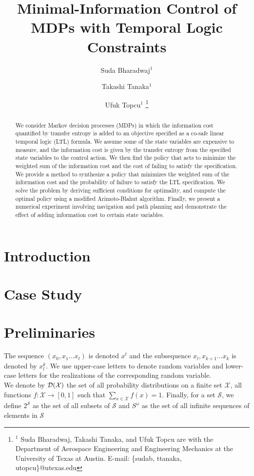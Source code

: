 \documentclass[letterpaper, 10 pt, conference]{ieeeconf}  %
\title{Minimal-Information Control of MDPs with Temporal Logic Constraints
}
\author{Suda Bharadwaj$^{1}$ \and Takashi Tanaka$^{1}$ \and Ufuk Topcu$^{1}$%
\thanks{$^{1}$ Suda Bharadwaj, Takashi Tanaka, and Ufuk Topcu are with the Department of Aerospace Engineering and Engineering Mechanics at the University of Texas at Austin. E-mail: \{sudab, ttanaka, utopcu\}@utexas.edu}%
}
\begin{document}
\maketitle
\thispagestyle{empty}
\pagestyle{empty}


\begin{abstract}
We consider Markov decision processes (MDPs) in which the information cost quantified by transfer entropy is added to an objective specified as a co-safe linear temporal logic (LTL) formula. We assume some of the state variables are expensive to measure, and the information cost is given by the transfer entropy from the specified state variables to the control action. We then find the policy that acts to minimize the weighted sum of the information cost and the cost of failing to satisfy the specification. We provide a method to synthesize a policy that minimizes the weighted sum of the information cost and the probability of failure to satisfy the LTL specification. We solve the problem by deriving sufficient conditions for optimality, and compute the optimal policy using a modified Arimoto-Blahut algorithm. Finally, we present a numerical experiment involving navigation and path planning and demonstrate the effect of adding information cost to certain state variables.
\end{abstract}


\section{Introduction}


\section{Case Study}\label{sec:casestudy}



\section{Preliminaries}
The sequence $(x_0,x_{1}...x_t)$ is denoted $x^t$ and the subsequence $x_l,x_{k+1}...x_k$ is denoted by $x_{l}^{k}$. We use upper-case letters to denote random variables and lower-case letters for the realizations of the corresponding random variable. \\
We denote by $\mathcal{D}(\mathcal{X})$ the set of all probability distributions on a finite
set $\mathcal{X}$, \ie all functions $f: \mathcal{X} \to [0,1]$ such that $\sum_{x\in \mathcal{X}}f(x)=1$. Finally, for a set $\mathcal{S}$, we define $2^\mathcal{S}$ as the set of all subsets of $\mathcal{S}$ and $S^{\omega}$ as the set of all infinite sequences of elements in $\mathcal{S}$
 
\end{document}
